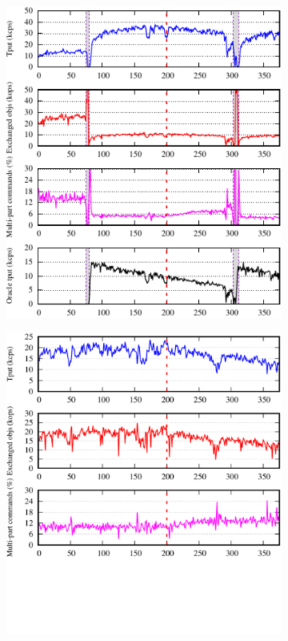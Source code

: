 \begin{figure}[h!]
  \centering
  \begin{subfigure}{.47\textwidth}
    \centering
    \includegraphics[width=\textwidth]{./figures/eurosys/chirper-celeb-dynastar.pdf}
    \caption{}
  \end{subfigure}
  \begin{subfigure}{.47\textwidth}
    \centering
    \includegraphics[width=\textwidth]{./figures/eurosys/chirper-celeb-ssmr.pdf}

\end{subfigure}
\end{figure}
